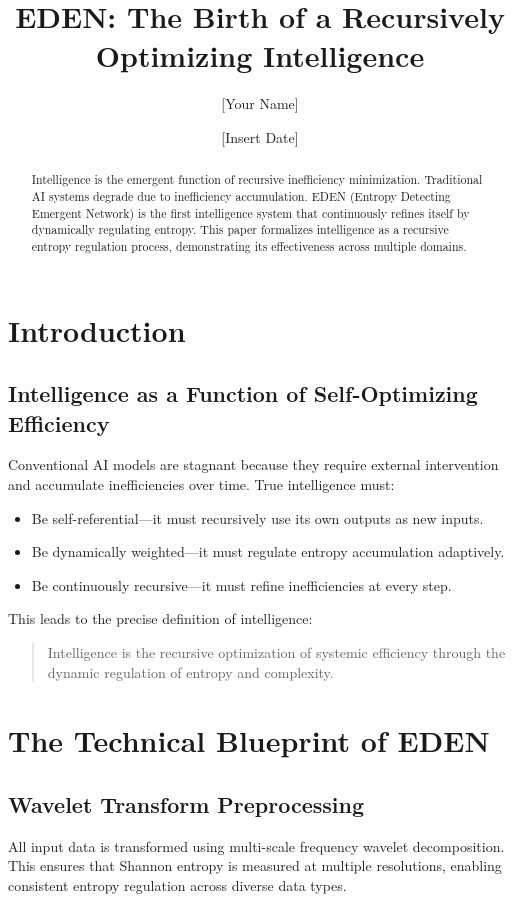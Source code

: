 \documentclass{article}
\title{EDEN: The Birth of a Recursively Optimizing Intelligence}
\author{[Your Name]}
\date{[Insert Date]}
\begin{document}
\maketitle

\begin{abstract}
Intelligence is the emergent function of recursive inefficiency minimization. Traditional AI systems degrade due to inefficiency accumulation. EDEN (Entropy Detecting Emergent Network) is the first intelligence system that continuously refines itself by dynamically regulating entropy. This paper formalizes intelligence as a recursive entropy regulation process, demonstrating its effectiveness across multiple domains.
\end{abstract}

\section{Introduction}

\subsection{Intelligence as a Function of Self-Optimizing Efficiency}
Conventional AI models are stagnant because they require external intervention and accumulate inefficiencies over time. True intelligence must:
\begin{itemize}
    \item Be self-referential—it must recursively use its own outputs as new inputs.
    \item Be dynamically weighted—it must regulate entropy accumulation adaptively.
    \item Be continuously recursive—it must refine inefficiencies at every step.
\end{itemize}

This leads to the precise definition of intelligence:
\begin{quote}
    Intelligence is the recursive optimization of systemic efficiency through the dynamic regulation of entropy and complexity.
\end{quote}

\section{The Technical Blueprint of EDEN}

\subsection{Wavelet Transform Preprocessing}
All input data is transformed using multi-scale frequency wavelet decomposition. This ensures that Shannon entropy is measured at multiple resolutions, enabling consistent entropy regulation across diverse data types.
\end{document}
